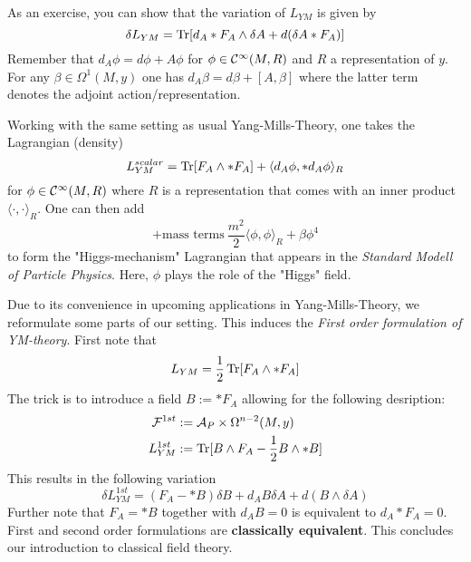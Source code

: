 \begin{ex}
  As an exercise, you can show that the variation of $L_{YM}$ is given by
  $$ \delta L_{YM} = \operatorname{Tr}[d_A * F_A \wedge \delta A + d(\delta A * F_A)] $$
  Remember that $d_A \phi = d\phi + A \phi$ for $\phi \in \Ci(M, R)$ and $R$ a representation of $y$. For any $\beta \in \Omega^1(M,y)$ one has $d_A \beta = d\beta + [A, \beta]$ where the latter term denotes the adjoint action/representation.
\end{ex}

\begin{definition}
  Working with the same setting as usual Yang-Mills-Theory, one takes the Lagrangian (density)
  $$ L^{scalar}_{YM} = \Tr[F_A \wedge * F_A] + \langle d_A \phi, *d_A \phi \rangle_R $$
  for $\phi \in \Ci(M, R)$ where $R$ is a representation that comes with an inner product $\langle \cdot , \cdot \rangle_R$. One can then add
  $$ + \text{mass terms} \ \frac{m^2}{2} \langle \phi, \phi \rangle_R + \beta \phi^4$$
  to form the "Higgs-mechanism" Lagrangian that appears in the \emph{Standard Modell of Particle Physics}. Here, $\phi$ plays the role of the "Higgs" field.
\end{definition}

Due to its convenience in upcoming applications in Yang-Mills-Theory, we reformulate some parts of our setting. This induces the \emph{First order formulation of YM-theory}. First note that
$$ L_{YM} = \frac{1}{2} \operatorname{Tr}[F_A \wedge * F_A] $$
The trick is to introduce a field $B := *F_A$ allowing for the following desription:
\begin{align*}
  {\mathcal{F}}^{1st} &:= \mathcal{A}_P \times \Omega^{n-2}(M,y) \\
  L^{1st}_{YM} &:= \operatorname{Tr}[B \wedge F_A - \frac{1}{2} B \wedge *B]
\end{align*}
This results in the following variation
$$ \delta L^{1st}_{YM} = (F_A - *B) \delta B + d_A B \delta A + d(B \wedge \delta A) $$
Further note that $F_A = *B$ together with $d_A B = 0$ is equivalent to $d_A * F_A = 0$. First and second order formulations are \textbf{classically equivalent}. This concludes our introduction to classical field theory.


\newpage
